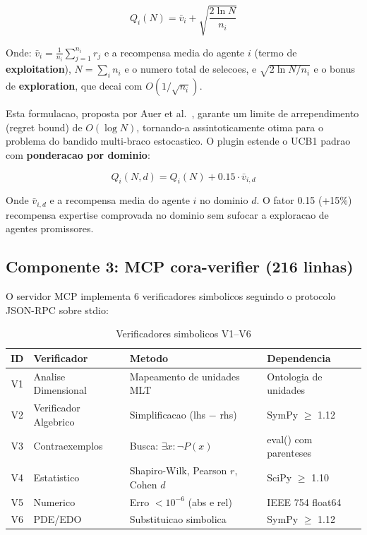 \documentclass[5p]{elsarticle}
\begin{document}
\begin{equation}\label{eq:qscore}
Q_i(N) = \bar{v}_i + \sqrt{\frac{2 \ln N}{n_i}}
\end{equation}

Onde: $\bar{v}_i = \frac{1}{n_i}\sum_{j=1}^{n_i} r_j$ e a recompensa media do agente $i$ (termo de \textbf{exploitation}), $N = \sum_i n_i$ e o numero total de selecoes, e $\sqrt{2\ln N / n_i}$ e o bonus de \textbf{exploration}, que decai com $O(1/\sqrt{n_i})$.

Esta formulacao, proposta por Auer et al.\ \cite{auer2002}, garante um limite de arrependimento (regret bound) de $O(\log N)$, tornando-a assintoticamente otima para o problema do bandido multi-braco estocastico. O plugin estende o UCB1 padrao com \textbf{ponderacao por dominio}:

\begin{equation}\label{eq:domain}
Q_i(N, d) = Q_i(N) + 0.15 \cdot \bar{v}_{i,d}
\end{equation}

Onde $\bar{v}_{i,d}$ e a recompensa media do agente $i$ no dominio $d$. O fator 0.15 (+15\%) recompensa expertise comprovada no dominio sem sufocar a exploracao de agentes promissores.

\subsection{Componente 3: MCP cora-verifier (216 linhas)}

O servidor MCP implementa 6 verificadores simbolicos seguindo o protocolo JSON-RPC sobre stdio:

\begin{table}[H]
\centering
\begin{tabular}{clll}
\toprule
\textbf{ID} & \textbf{Verificador} & \textbf{Metodo} & \textbf{Dependencia} \\
\midrule
V1 & Analise Dimensional & Mapeamento de unidades MLT & Ontologia de unidades \\
V2 & Verificador Algebrico & Simplificacao (lhs $-$ rhs) & SymPy $\geq$ 1.12 \\
V3 & Contraexemplos & Busca: $\exists x: \neg P(x)$ & eval() com parenteses \\
V4 & Estatistico & Shapiro-Wilk, Pearson $r$, Cohen $d$ & SciPy $\geq$ 1.10 \\
V5 & Numerico & Erro $< 10^{-6}$ (abs e rel) & IEEE 754 float64 \\
V6 & PDE/EDO & Substituicao simbolica & SymPy $\geq$ 1.12 \\
\bottomrule
\end{tabular}
\caption{Verificadores simbolicos V1--V6}
\end{table}
\end{document}
